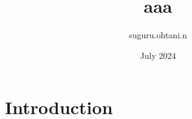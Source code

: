 \documentclass{article}
\title{aaa}
\author{suguru.ohtani.n }
\date{July 2024}
\begin{document}
\maketitle

\section{Introduction}
\end{document}
